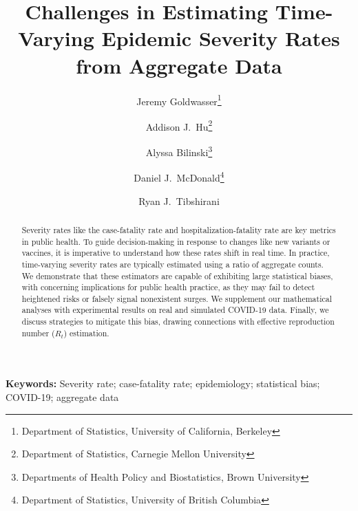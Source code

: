 \documentclass{article}
\title{Challenges in Estimating Time-Varying Epidemic Severity Rates from
  Aggregate Data}
\author{Jeremy Goldwasser\thanks{Department of Statistics, University of
    California, Berkeley} 
  \and  
  Addison J.\ Hu\thanks{Department of Statistics, Carnegie Mellon University}
  \and 
  Alyssa Bilinski\thanks{Departments of Health Policy and Biostatistics, Brown University} 
  \and
  Daniel J.\ McDonald\thanks{Department of Statistics, University of British
    Columbia} 
  \and 
  Ryan J.\ Tibshirani\footnotemark[1]}
\date{}
\begin{document}
\maketitle

\begin{abstract}
Severity rates like the case-fatality rate and hospitalization-fatality rate are
key metrics in public health. To guide decision-making in response to changes
like new variants or vaccines, it is imperative to understand how these rates
shift in real time. In practice, time-varying severity rates are typically
estimated using a ratio of aggregate counts. We demonstrate that these
estimators are capable of exhibiting large statistical biases, with concerning
implications for public health practice, as they may fail to detect heightened 
risks or falsely signal nonexistent surges. We supplement our mathematical 
analyses with experimental results on real and simulated COVID-19 data. Finally,
we discuss strategies to mitigate this bias, drawing connections with
effective reproduction number ($R_t$) estimation.    
\end{abstract}

\vspace{1em}
\noindent\textbf{Keywords:}
Severity rate; case-fatality rate; epidemiology; statistical bias; COVID-19; aggregate data

\end{document}
